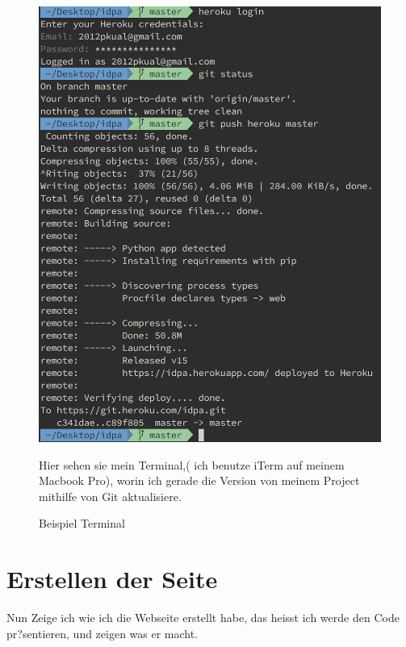 \documentclass{article}
\begin{document}
            \begin{figure}[ht]
                \centering
                \includegraphics[width=.8\linewidth]{cli-heroku}
                \caption{Beispiel Terminal}
                \label{fig:sub1}{Hier sehen sie mein Terminal,(
                ich benutze iTerm auf meinem Macbook Pro),
                worin ich gerade
                die Version von meinem Project mithilfe von Git aktualisiere.}
                \end{figure}
\cleardoublepage










\section{Erstellen der Seite}
Nun Zeige ich wie ich die Webseite erstellt habe, das heisst ich werde den Code pr?sentieren, und zeigen was er macht.
\end{document}
